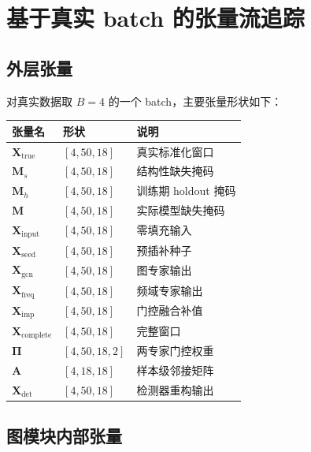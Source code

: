 \documentclass[UTF8]{ctexart}
\begin{document}
\section{基于真实 batch 的张量流追踪}

\subsection{外层张量}

对真实数据取 \(B=4\) 的一个 batch，主要张量形状如下：
\begin{center}
\begin{tabular}{lll}
\toprule
张量名 & 形状 & 说明 \\
\midrule
\(\bm{X}_{\text{true}}\) & \([4,50,18]\) & 真实标准化窗口 \\
\(\bm{M}_s\) & \([4,50,18]\) & 结构性缺失掩码 \\
\(\bm{M}_h\) & \([4,50,18]\) & 训练期 holdout 掩码 \\
\(\bm{M}\) & \([4,50,18]\) & 实际模型缺失掩码 \\
\(\bm{X}_{\text{input}}\) & \([4,50,18]\) & 零填充输入 \\
\(\bm{X}_{\text{seed}}\) & \([4,50,18]\) & 预插补种子 \\
\(\bm{X}_{\text{gcn}}\) & \([4,50,18]\) & 图专家输出 \\
\(\bm{X}_{\text{freq}}\) & \([4,50,18]\) & 频域专家输出 \\
\(\bm{X}_{\text{imp}}\) & \([4,50,18]\) & 门控融合补值 \\
\(\bm{X}_{\text{complete}}\) & \([4,50,18]\) & 完整窗口 \\
\(\bm{\Pi}\) & \([4,50,18,2]\) & 两专家门控权重 \\
\(\bm{A}\) & \([4,18,18]\) & 样本级邻接矩阵 \\
\(\bm{X}_{\text{det}}\) & \([4,50,18]\) & 检测器重构输出 \\
\bottomrule
\end{tabular}
\end{center}

\subsection{图模块内部张量}
\end{document}
